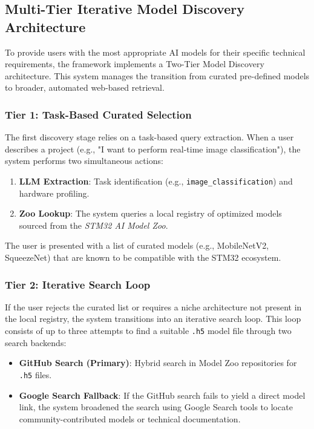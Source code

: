 \subsection{Multi-Tier Iterative Model Discovery Architecture}

To provide users with the most appropriate AI models for their specific technical requirements, the framework implements a Two-Tier Model Discovery architecture. This system manages the transition from curated pre-defined models to broader, automated web-based retrieval.

\subsubsection{Tier 1: Task-Based Curated Selection}

The first discovery stage relies on a task-based query extraction. When a user describes a project (e.g., "I want to perform real-time image classification"), the system performs two simultaneous actions:
\begin{enumerate}
    \item \textbf{LLM Extraction}: Task identification (e.g., \texttt{image\_classification}) and hardware profiling.
    \item \textbf{Zoo Lookup}: The system queries a local registry of optimized models sourced from the \textit{STM32 AI Model Zoo}.
\end{enumerate}

The user is presented with a list of curated models (e.g., MobileNetV2, SqueezeNet) that are known to be compatible with the STM32 ecosystem.

\subsubsection{Tier 2: Iterative Search Loop}

If the user rejects the curated list or requires a niche architecture not present in the local registry, the system transitions into an iterative search loop. This loop consists of up to three attempts to find a suitable \texttt{.h5} model file through two search backends:

\begin{itemize}
    \item \textbf{GitHub Search (Primary)}: Hybrid search in Model Zoo repositories for \texttt{.h5} files.
    \item \textbf{Google Search Fallback}: If the GitHub search fails to yield a direct model link, the system broadened the search using Google Search tools to locate community-contributed models or technical documentation.
\end{itemize}

